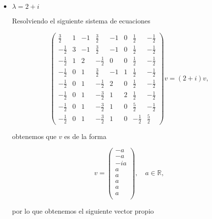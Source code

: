 \documentclass[letterpaper]{article}
\theoremstyle{definition}
\theoremstyle{lemathm}
\theoremstyle{lemademthm}
\newcommand{\pars}[1]{\left( #1 \right) }
\newcommand{\RR}{\mathbb{R}}
\newcommand{\1}{\mathbbm{1}}
\begin{document}
\begin{enumerate}
\begin{itemize}
			\item $\lambda = 2+i$
			
			Resolviendo el siguiente sistema de ecuaciones
			
			\[\pars{\begin{array}{cccccccc} \frac{3}{2} & 1 & -1 & \frac{3}{2} & -1 & 0 & \frac{1}{2} & -\frac{1}{2} \\[1ex] -\frac{1}{2} & 3 & -1 & \frac{3}{2} & -1 & 0 & \frac{1}{2} & -\frac{1}{2} \\[1ex] -\frac{1}{2} & 1 & 2 & -\frac{1}{2} & 0 & 0 & \frac{1}{2} & -\frac{1}{2} \\[1ex] -\frac{1}{2} & 0 & 1 & \frac{3}{2} & -1 & 1 & \frac{1}{2} & -\frac{1}{2} \\[1ex] -\frac{1}{2} & 0 & 1 & -\frac{1}{2} & 2 & 0 & \frac{1}{2} & -\frac{1}{2} \\[1ex] -\frac{1}{2} & 0 & 1 & -\frac{3}{2} & 1 & 2 & \frac{1}{2} & -\frac{1}{2} \\[1ex] -\frac{1}{2} & 0 & 1 & -\frac{3}{2} & 1 & 0 & \frac{5}{2} & -\frac{1}{2} \\[1ex] -\frac{1}{2} & 0 & 1 & -\frac{3}{2} & 1 & 0 & -\frac{1}{2} & \frac{5}{2} \end{array}} v = (2+i) v,\]

			obtenemos que $v$ es de la forma

			\[v = \pars{\begin{array}{c}
				-a\\[1ex]
				-a\\[1ex]
				-ia\\[1ex]
				a\\[1ex]
				a\\[1ex]
				a\\[1ex]
				a\\[1ex]
				a\\
			\end{array}}, \quad a\in\RR,\]

			por lo que obtenemos el siguiente vector propio


\end{itemize}
\end{enumerate}
\end{document}
